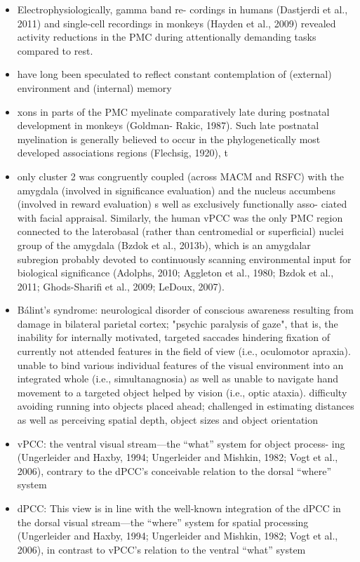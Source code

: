 \documentclass{article} %
\begin{document}
\begin{itemize}
\begin{itemize}
  \item
Electrophysiologically, gamma band re- cordings in humans (Dastjerdi et al., 2011) and single-cell recordings in monkeys (Hayden et al., 2009) revealed activity reductions in the PMC during attentionally demanding tasks compared to rest.

\item
 have long been speculated to reflect constant contemplation of (external) environment and (internal) memory

 \item
   xons in parts of the PMC myelinate comparatively late during postnatal development in monkeys (Goldman- Rakic, 1987). Such late postnatal myelination is generally believed to occur in the phylogenetically most developed associations regions (Flechsig, 1920), t

\item
only cluster 2 was congruently coupled (across MACM and RSFC) with the amygdala (involved in significance evaluation) and the nucleus accumbens (involved in reward evaluation)
s well as exclusively functionally asso- ciated with facial appraisal. Similarly, the human vPCC was the only PMC region connected to the laterobasal (rather than centromedial or superficial) nuclei group of the amygdala (Bzdok et al., 2013b), which is an amygdalar subregion probably devoted to continuously scanning environmental input for biological significance (Adolphs, 2010; Aggleton et al., 1980; Bzdok et al., 2011; Ghods-Sharifi et al., 2009; LeDoux, 2007).

\item Bálint's syndrome: neurological disorder of conscious
awareness resulting from damage in bilateral parietal cortex;
"psychic paralysis of gaze", that is, the inability for internally
motivated, targeted saccades hindering fixation of currently not
attended features in the field of view (i.e., oculomotor apraxia).
unable to bind various individual features of the visual
environment into an integrated whole (i.e., simultanagnosia)
as well as unable to navigate hand movement to a targeted
object helped by vision (i.e., optic ataxia).
difficulty avoiding running into objects placed ahead;
challenged in estimating distances as well as perceiving
spatial depth, object sizes and object orientation


  \item
    vPCC:
the ventral visual stream—the “what” system for object process- ing (Ungerleider and Haxby, 1994; Ungerleider and Mishkin, 1982; Vogt et al., 2006), contrary to the dPCC's conceivable relation to the dorsal “where” system
\item
  dPCC:
This view is in line with the well-known integration of the dPCC in the dorsal visual stream—the “where” system for spatial processing (Ungerleider and Haxby, 1994; Ungerleider and Mishkin, 1982; Vogt et al., 2006), in contrast to vPCC's relation to the ventral “what” system
\end{itemize}




\end{itemize}
\end{document}
